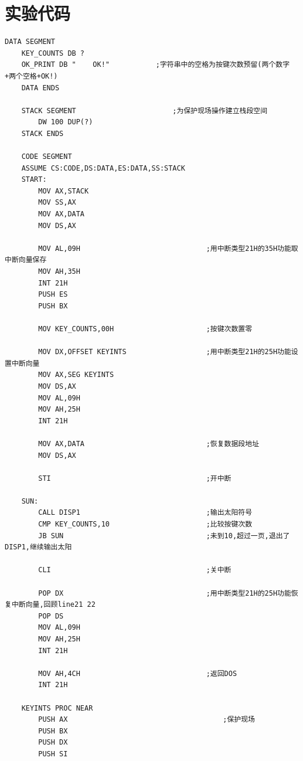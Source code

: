 \documentclass[11pt]{SEU-Digital-Report}
\begin{document}
\section{实验代码}
\begin{lstlisting}[language={[x86masm]Assembler},title=code]
    DATA SEGMENT
    KEY_COUNTS DB ?
    OK_PRINT DB "    OK!"           ;字符串中的空格为按键次数预留(两个数字+两个空格+OK!)
    DATA ENDS

    STACK SEGMENT                       ;为保护现场操作建立栈段空间
        DW 100 DUP(?)
    STACK ENDS

    CODE SEGMENT
    ASSUME CS:CODE,DS:DATA,ES:DATA,SS:STACK
    START:
        MOV AX,STACK
        MOV SS,AX
        MOV AX,DATA
        MOV DS,AX

        MOV AL,09H                              ;用中断类型21H的35H功能取中断向量保存
        MOV AH,35H
        INT 21H
        PUSH ES
        PUSH BX

        MOV KEY_COUNTS,00H                      ;按键次数置零

        MOV DX,OFFSET KEYINTS                   ;用中断类型21H的25H功能设置中断向量
        MOV AX,SEG KEYINTS
        MOV DS,AX
        MOV AL,09H
        MOV AH,25H
        INT 21H

        MOV AX,DATA                             ;恢复数据段地址
        MOV DS,AX

        STI                                     ;开中断

    SUN:
        CALL DISP1                              ;输出太阳符号
        CMP KEY_COUNTS,10                       ;比较按键次数
        JB SUN                                  ;未到10,超过一页,退出了DISP1,继续输出太阳

        CLI                                     ;关中断

        POP DX                                  ;用中断类型21H的25H功能恢复中断向量,回顾line21 22
        POP DS
        MOV AL,09H
        MOV AH,25H
        INT 21H                            

        MOV AH,4CH                              ;返回DOS
        INT 21H

    KEYINTS PROC NEAR
        PUSH AX                                     ;保护现场
        PUSH BX
        PUSH DX
        PUSH SI


\end{lstlisting}
\end{document}
